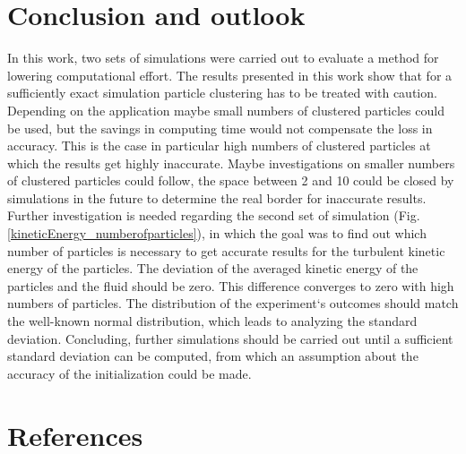 \documentclass[11pt,a4paper,openany,oneside,parskip=half*]{article}
\begin{document}
\section{Conclusion and outlook}
In this work, two sets of simulations were carried out to evaluate a method for lowering computational effort. 
\newline
The results presented in this work show that for a sufficiently exact simulation particle clustering has to be treated with caution. Depending on the application maybe small numbers of clustered particles could be used, but the savings in computing time would not compensate the loss in accuracy. This is the case in particular high numbers of clustered particles at which the results get highly inaccurate. Maybe investigations on smaller numbers of clustered particles could follow, the space between 2 and 10 could be closed by simulations in the future to determine the real border for inaccurate results. 
\newline
Further investigation is needed regarding the second set of simulation (Fig. \ref{kineticEnergy_numberofparticles}), in which the goal was to find out which number of particles is necessary to get accurate results for the turbulent kinetic energy of the particles. The deviation of the averaged kinetic energy of the particles and the fluid should be zero. This difference converges to zero with high numbers of particles. The distribution of the experiment`s outcomes should match the well-known normal distribution, which leads to analyzing the standard deviation. Concluding, further simulations should be carried out until a sufficient standard deviation can be computed, from which an assumption about the accuracy of the initialization could be made.
\newline
\pagebreak
\section{References}
\vspace*{-1.2cm}
\nocite{*} %
\pagebreak
\end{document}
